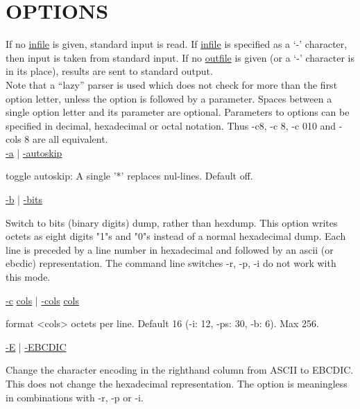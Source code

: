 \documentclass{ctexart}
\begin{document}
\section*{OPTIONS}
\begin{adjustwidth}{1cm}{0cm}
If no \underline{infile} is given, standard input is read.  If
\underline{infile} is specified as a `-' character, then input is taken from
standard input.  If no \underline{outfile} is given (or a `-' character is in
its place), results are sent to standard output. \\

\noindent Note that a ``lazy'' parser is used which does not check for more than
the first option letter, unless the option is followed by a parameter.  Spaces
between a single option letter and its parameter are optional.  Parameters to
options can be specified in decimal, hexadecimal or octal notation.  Thus -c8,
-c 8, -c 010 and -cols 8 are all equivalent.  \\

\noindent \underline{-a} | \underline{-autoskip} 
\begin{adjustwidth}{1cm}{0cm}
  toggle autoskip: A single '*' replaces nul-lines.  Default off. \\
\end{adjustwidth}

\noindent \underline{-b} | \underline{-bits} 
\begin{adjustwidth}{1cm}{0cm}
  Switch to bits (binary digits) dump, rather than hexdump.  This option writes
  octets as eight digits "1"s and "0"s instead of a normal hexadecimal dump. Each
  line is  preceded by a line number in hexadecimal and followed by an ascii (or
  ebcdic) representation. The command line switches -r, -p, -i do not work with
  this mode. \\
\end{adjustwidth}

\noindent \underline{-c} \underline{cols} | \underline{-cols} \underline{cols}
\begin{adjustwidth}{1cm}{0cm}
  format <cols> octets per line. Default 16 (-i: 12, -ps: 30, -b: 6). Max 256. \\
\end{adjustwidth}

\noindent \underline{-E} | \underline{-EBCDIC}
\begin{adjustwidth}{1cm}{0cm}
  Change the character encoding in the righthand column from ASCII to EBCDIC.
  This does not change the hexadecimal representation. The option is meaningless
  in combinations with -r, -p or -i. \\
\end{adjustwidth}


\end{adjustwidth}
\end{document}

